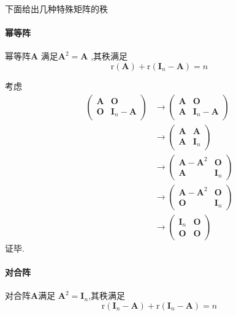 \begin{brown}
\begin{example}下面给出几种特殊矩阵的秩
    \paragraph{幂等阵}幂等阵$\bm{A}$
满足$\bm{A}^2=\bm{A}$
,其秩满足
\[
    \mathrm{r}\left(\bm{A}\right)
    +\mathrm{r}\left(\bm{I}_n
    -\bm{A}\right) = 
    n
\]
\begin{Proof}
考虑
\begin{align*}
    \begin{pmatrix}
        \bm{A}&\bm{O}\\
        \bm{O}&\bm{I}_n-\bm{A}
    \end{pmatrix}&\longrightarrow
    \begin{pmatrix}
        \bm{A}&\bm{O}\\
        \bm{A}&\bm{I}_n-\bm{A}
    \end{pmatrix}\\
    &\longrightarrow
    \begin{pmatrix}
        \bm{A}&\bm{A}\\
        \bm{A}&\bm{I}_n
    \end{pmatrix}\\
    &\longrightarrow
    \begin{pmatrix}
        \bm{A}-\bm{A}^2&\bm{O}\\
        \bm{A}&\bm{I}_n
    \end{pmatrix}\\
    &\longrightarrow
    \begin{pmatrix}
        \bm{A}-\bm{A}^2&\bm{O}\\
        \bm{O}&\bm{I}_n
    \end{pmatrix}\\
    &\longrightarrow
    \begin{pmatrix}
        \bm{I}_n&\bm{O}\\\bm{O}&\bm{O}
    \end{pmatrix}
\end{align*}
证毕.
\end{Proof}
\paragraph{对合阵}对合阵$\bm{A}$满足
$\bm{A}^2 = \bm{I}_n$,其秩满足
\[
    \mathrm{r}\left(
        \bm{I}_n - \bm{A}\right)
    +\mathrm{r}\left(\bm{I}_n
    -\bm{A}\right) = 
    n
\]
\end{example}
\end{brown}

